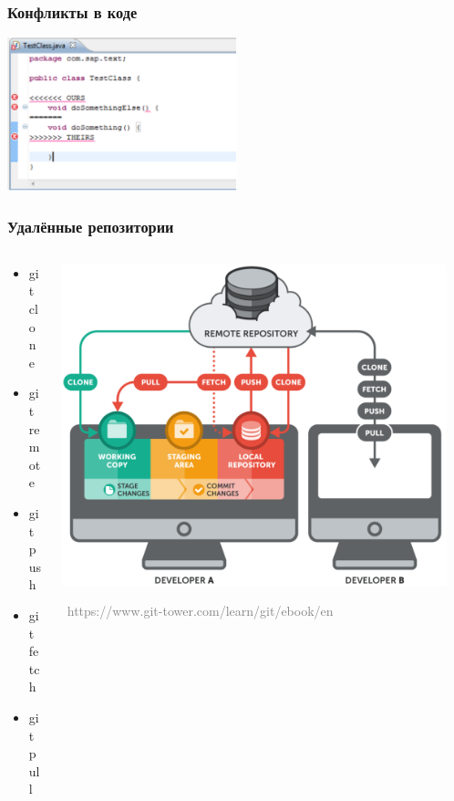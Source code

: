 \documentclass[xetex,mathserif,serif]{beamer}
\newcommand{\attribution}[1] {
    \vspace{-5mm}\begin{flushright}\begin{scriptsize}\textcolor{gray}{\textcopyright\, #1}\end{scriptsize}\end{flushright}
}
\begin{document}
    \begin{frame}
        \frametitle{Конфликты в коде}
        \begin{center}
            \includegraphics[width=0.5\textwidth]{conflictsInCode.png}
        \end{center}
    \end{frame}

    \begin{frame}
        \frametitle{Удалённые репозитории}
        \begin{columns}
            \begin{column}{0.4\textwidth}
                \begin{itemize}
                    \item git clone
                    \item git remote
                    \item git push
                    \item git fetch
                    \item git pull
                \end{itemize}
            \end{column}
            \begin{column}{0.6\textwidth}
                \begin{center}
                    \includegraphics[width=0.95\textwidth]{remoteRepos.png}
                    \attribution{https://www.git-tower.com/learn/git/ebook/en}
                \end{center}
            \end{column}
        \end{columns}
    \end{frame}
\end{document}
